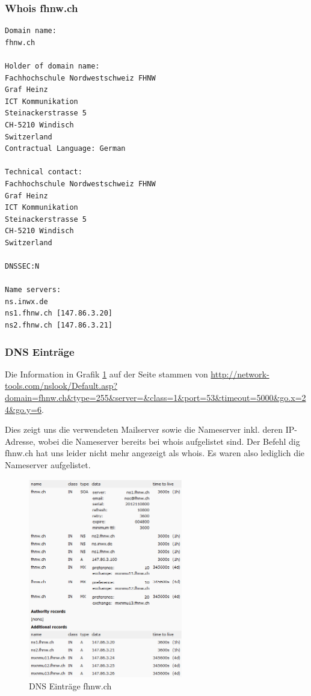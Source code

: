 \documentclass[a4paper,11pt]{scrartcl}
\begin{document}
\subsubsection{Whois fhnw.ch}
\begin{lstlisting}
Domain name:
fhnw.ch

Holder of domain name:
Fachhochschule Nordwestschweiz FHNW
Graf Heinz
ICT Kommunikation
Steinackerstrasse 5
CH-5210 Windisch
Switzerland
Contractual Language: German

Technical contact:
Fachhochschule Nordwestschweiz FHNW
Graf Heinz
ICT Kommunikation
Steinackerstrasse 5
CH-5210 Windisch
Switzerland

DNSSEC:N

Name servers:
ns.inwx.de
ns1.fhnw.ch [147.86.3.20]
ns2.fhnw.ch [147.86.3.21]
\end{lstlisting}

\subsubsection{DNS Einträge}
Die Information in Grafik \ref{fig:dns_records} auf der Seite \pageref{fig:dns_records} stammen von \url{http://network-tools.com/nslook/Default.asp?domain=fhnw.ch&type=255&server=&class=1&port=53&timeout=5000&go.x=24&go.y=6}.

Dies zeigt uns die verwendeten Mailserver sowie die Nameserver inkl. deren IP-Adresse, wobei die Nameserver bereits bei whois aufgelistet sind. Der Befehl \glqq{}dig fhnw.ch\grqq{} hat uns leider nicht mehr angezeigt als whois. Es waren also lediglich die Nameserver aufgelistet.
\begin{figure}[p]
	\centering
	\includegraphics[width=0.6\textwidth]{../aufg5/dns_records.png}
	\caption{DNS Einträge fhnw.ch}
	\label{fig:dns_records}
\end{figure}
\end{document}
